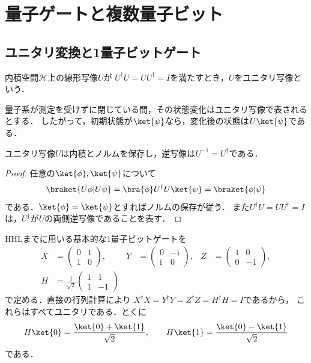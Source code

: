 \section{量子ゲートと複数量子ビット}
\label{sec:gates-composite}

\subsection{ユニタリ変換と1量子ビットゲート}

\begin{defi}[ユニタリ写像]
内積空間$\mathcal H$上の線形写像$U$が
$U^\dagger U=UU^\dagger=I$を満たすとき，$U$をユニタリ写像という．
\end{defi}

量子系が測定を受けずに閉じている間，その状態変化はユニタリ写像で表されるとする．
したがって，初期状態が$\ket{\psi}$なら，変化後の状態は$U\ket{\psi}$である．

\begin{prop}
ユニタリ写像$U$は内積とノルムを保存し，逆写像は$U^{-1}=U^\dagger$である．
\end{prop}
\begin{proof}
任意の$\ket{\phi},\ket{\psi}$について
\[
  \braket{U\phi|U\psi}
  =\bra{\phi}U^\dagger U\ket{\psi}
  =\braket{\phi|\psi}
\]
である．$\ket{\phi}=\ket{\psi}$とすればノルムの保存が従う．
また$U^\dagger U=UU^\dagger=I$は，$U^\dagger$が$U$の両側逆写像であることを表す．
\end{proof}

HHLまでに用いる基本的な1量子ビットゲートを
\begin{align}
  X&=\begin{pmatrix}0&1\\1&0\end{pmatrix},&
  Y&=\begin{pmatrix}0&-\mathrm{i}\\\mathrm{i}&0\end{pmatrix},&
  Z&=\begin{pmatrix}1&0\\0&-1\end{pmatrix},\\
  H&=\frac1{\sqrt2}\begin{pmatrix}1&1\\1&-1\end{pmatrix}
\end{align}
で定める．直接の行列計算により
$X^\dagger X=Y^\dagger Y=Z^\dagger Z=H^\dagger H=I$であるから，
これらはすべてユニタリである．とくに
\begin{equation}
  H\ket{0}=\frac{\ket{0}+\ket{1}}{\sqrt2},
  \qquad
  H\ket{1}=\frac{\ket{0}-\ket{1}}{\sqrt2}
  \label{eq:hadamard-action}
\end{equation}
である．

